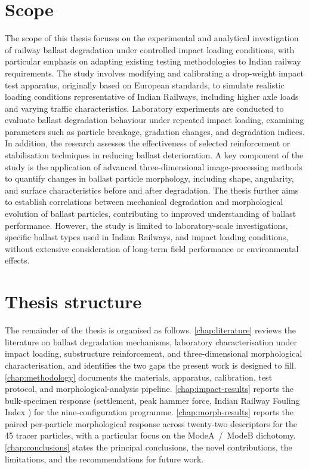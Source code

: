 \section{Scope}
\label{sec:intro-scope}

The scope of this thesis focuses on the experimental and analytical
investigation of railway ballast degradation under controlled impact
loading conditions, with particular emphasis on adapting existing testing
methodologies to Indian railway requirements. The study involves modifying
and calibrating a drop-weight impact test apparatus, originally based on
European standards, to simulate realistic loading conditions representative
of Indian Railways, including higher axle loads and varying traffic
characteristics. Laboratory experiments are conducted to evaluate ballast
degradation behaviour under repeated impact loading, examining parameters
such as particle breakage, gradation changes, and degradation indices. In
addition, the research assesses the effectiveness of selected reinforcement
or stabilisation techniques in reducing ballast deterioration. A key
component of the study is the application of advanced three-dimensional
image-processing methods to quantify changes in ballast particle
morphology, including shape, angularity, and surface characteristics before
and after degradation. The thesis further aims to establish correlations
between mechanical degradation and morphological evolution of ballast
particles, contributing to improved understanding of ballast performance.
However, the study is limited to laboratory-scale investigations, specific
ballast types used in Indian Railways, and impact loading conditions,
without extensive consideration of long-term field performance or
environmental effects.

\section{Thesis structure}
\label{sec:intro-structure}

The remainder of the thesis is organised as follows.
\cref{chap:literature} reviews the literature on ballast degradation
mechanisms, laboratory characterisation under impact loading,
substructure reinforcement, and three-dimensional morphological
characterisation, and identifies the two gaps the present work is
designed to fill. \cref{chap:methodology} documents the materials,
apparatus, calibration, test protocol, and morphological-analysis
pipeline. \cref{chap:impact-results} reports the bulk-specimen response
(settlement, peak hammer force, Indian Railway Fouling Index \FIIN) for
the nine-configuration programme. \cref{chap:morph-results} reports the
paired per-particle morphological response across twenty-two descriptors
for the 45 tracer particles, with a particular focus on the
\gls{ModeA}~/~\gls{ModeB} dichotomy. \cref{chap:conclusions} states the
principal conclusions, the novel contributions, the limitations, and the
recommendations for future work.

